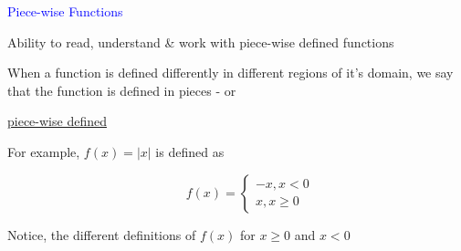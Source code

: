 \documentclass[14pt,fleqn]{extarticle}
\begin{document}
\begin{skill}
\textcolor{blue}{Piece-wise Functions}

Ability to read, understand \& work with piece-wise defined functions
\end{skill}

\newcard 

When a function is defined differently in
different regions of it's domain, we say
that the function is  defined in pieces - 
or 

\underline{piece-wise defined}\newline 

For example, $f(x) = \vert x\vert$ is defined as 

\[ \qquad f(x) = \begin{cases} 
-x, x < 0 \\
x, x\geq 0 
\end{cases} \]

Notice, the different definitions of $f(x)$ for 
$x\geq 0$ and $x <  0$
%
\end{document}

